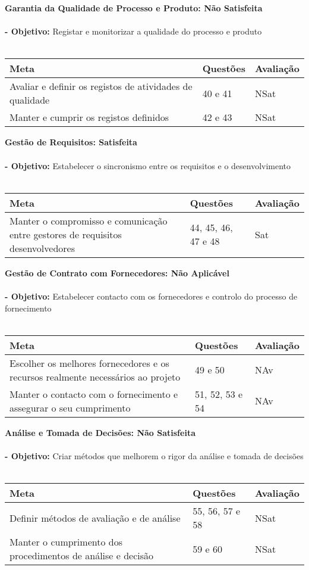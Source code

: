 \documentclass[openany,10pt,a4paper]{article}
\begin{document}
\textbf{Garantia da Qualidade de Processo e Produto: Não Satisfeita} \\  \\
\textbf{- Objetivo:} Registar e monitorizar a qualidade do processo e produto \\
\\
\begin{tabular}{p{3in}|p{1.5in}|p{1.5in}}	
\textbf{Meta} & \textbf{Questões} & \textbf{Avaliação} \\ \hline
Avaliar e definir os registos de atividades de qualidade & 40 e 41 & NSat \\ 
Manter e cumprir os registos definidos & 42 e 43 & NSat \\ 
\end{tabular}

\textbf{Gestão de Requisitos: Satisfeita} \\  \\
\textbf{- Objetivo:} Estabelecer o sincronismo entre os requisitos e o desenvolvimento \\
\\
\begin{tabular}{p{3in}|p{1.5in}|p{1.5in}}		
\textbf{Meta} & \textbf{Questões} & \textbf{Avaliação} \\ \hline
Manter o compromisso e comunicação entre gestores de requisitos desenvolvedores & 44, 45, 46, 47 e 48 & Sat \\ 
\end{tabular}

\textbf{Gestão de Contrato com Fornecedores: Não Aplicável} \\  \\
\textbf{- Objetivo:} Estabelecer contacto com os fornecedores e controlo do processo de fornecimento \\
\\
\begin{tabular}{p{3in}|p{1.5in}|p{1.5in}}	
\textbf{Meta} & \textbf{Questões} & \textbf{Avaliação} \\ \hline
Escolher os melhores fornecedores e os recursos realmente necessários ao projeto & 49 e 50 & NAv \\ 
Manter o contacto com o fornecimento e assegurar o seu cumprimento & 51, 52, 53 e 54 & NAv \\ 
\end{tabular}

\textbf{Análise e Tomada de Decisões: Não Satisfeita} \\  \\
\textbf{- Objetivo:} Criar métodos que melhorem o rigor da análise e tomada de decisões \\
\\
\begin{tabular}{p{3in}|p{1.5in}|p{1.5in}}	
\textbf{Meta} & \textbf{Questões} & \textbf{Avaliação} \\ \hline
Definir métodos de avaliação e de análise & 55, 56, 57 e 58 & NSat \\ 
Manter o cumprimento dos procedimentos de análise e decisão & 59 e 60 & NSat \\
\end{tabular}
\end{document}

